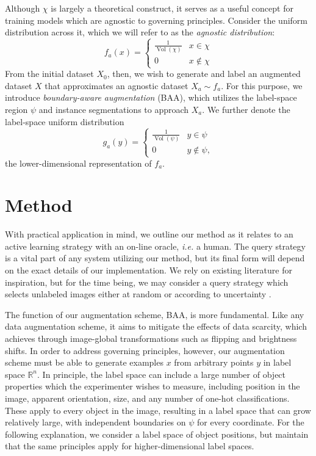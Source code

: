 \documentclass[10pt, draftcls]{IEEEtran}
\DeclareMathOperator{\vol}{Vol}
\begin{document}
Although $\chi$ is largely a theoretical construct, it serves as a useful
concept for training models which are agnostic to governing principles. Consider
the uniform distribution across it, which we will refer to as the \emph{agnostic
  distribution}:
\[ f_a(x) =
  \begin{cases}
    \frac{1}{\vol(\chi)} & x \in \chi \\
    0 & x \not\in \chi
  \end{cases}
\] From the initial dataset $X_0$, then, we wish to generate and label an
augmented dataset $X$ that approximates an agnostic dataset $X_a \sim f_a$. For
this purpose, we introduce \emph{boundary-aware augmentation} (BAA), which
utilizes the label-space region $\psi$ and instance segmentations to approach
$X_a$. We further denote the label-space uniform distribution
\[ g_a(y) =
  \begin{cases}
    \frac{1}{\vol(\psi)} & y \in \psi \\
    0 & y \not\in \psi,
  \end{cases}
\] the lower-dimensional representation of $f_a$.


\section{Method}
\label{sec:method}

With practical application in mind, we outline our method as it relates to an
active learning strategy with an on-line oracle, \emph{i.e.} a human. The query
strategy is a vital part of any system utilizing our method, but its final form
will depend on the exact details of our implementation. We rely on existing
literature for inspiration, but for the time being, we may consider a query
strategy which selects unlabeled images either at random or according to
uncertainty \cite{settles_active_2012, vezhnevets_active_2012}.

The function of our augmentation scheme, BAA, is more fundamental. Like any data
augmentation scheme, it aims to mitigate the effects of data scarcity, which
\cite{krizhevsky_imagenet_2012} achieves through image-global transformations
such as flipping and brightness shifts. In order to address governing
principles, however, our augmentation scheme must be able to generate examples
$x$ from arbitrary points $y$ in label space $\mathbb{R}^n$. In principle, the
label space can include a large number of object properties which the
experimenter wishes to measure, including position in the image, apparent
orientation, size, and any number of one-hot classifications. These apply to
every object in the image, resulting in a label space that can grow relatively
large, with independent boundaries on $\psi$ for every coordinate. For the
following explanation, we consider a label space of object positions, but
maintain that the same principles apply for higher-dimensional label spaces.
\end{document}
